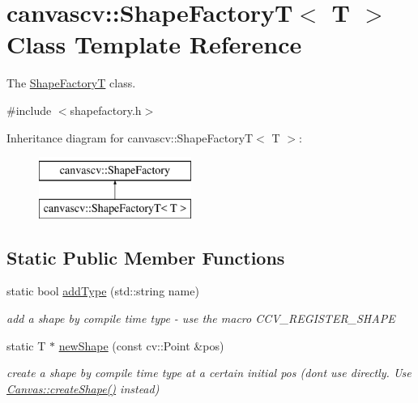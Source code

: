 \hypertarget{classcanvascv_1_1ShapeFactoryT}{}\section{canvascv\+:\+:Shape\+FactoryT$<$ T $>$ Class Template Reference}
\label{classcanvascv_1_1ShapeFactoryT}


The \hyperlink{classcanvascv_1_1ShapeFactoryT}{Shape\+FactoryT} class.  




{\ttfamily \#include $<$shapefactory.\+h$>$}

Inheritance diagram for canvascv\+:\+:Shape\+FactoryT$<$ T $>$\+:\begin{figure}[H]
\begin{center}
\leavevmode
\includegraphics[height=2.000000cm]{classcanvascv_1_1ShapeFactoryT}
\end{center}
\end{figure}
\subsection*{Static Public Member Functions}
\begin{DoxyCompactItemize}
\item 
static bool \hyperlink{classcanvascv_1_1ShapeFactoryT_a7d2e3d1e856ba83cb107439ceee53229}{add\+Type} (std\+::string name)\hypertarget{classcanvascv_1_1ShapeFactoryT_a7d2e3d1e856ba83cb107439ceee53229}{}\label{classcanvascv_1_1ShapeFactoryT_a7d2e3d1e856ba83cb107439ceee53229}

\begin{DoxyCompactList}\small\item\em add a shape by compile time type -\/ use the macro C\+C\+V\+\_\+\+R\+E\+G\+I\+S\+T\+E\+R\+\_\+\+S\+H\+A\+PE \end{DoxyCompactList}\item 
static T $\ast$ \hyperlink{classcanvascv_1_1ShapeFactoryT_a0a0a0d4bae966b362ca68485d34fe1ae}{new\+Shape} (const cv\+::\+Point \&pos)\hypertarget{classcanvascv_1_1ShapeFactoryT_a0a0a0d4bae966b362ca68485d34fe1ae}{}\label{classcanvascv_1_1ShapeFactoryT_a0a0a0d4bae966b362ca68485d34fe1ae}

\begin{DoxyCompactList}\small\item\em create a shape by compile time type at a certain initial pos (don\textquotesingle{}t use directly. Use \hyperlink{classcanvascv_1_1Canvas_a630ac92458f1718d0c597e96dd5a4aef}{Canvas\+::create\+Shape()} instead) \end{DoxyCompactList}\end{DoxyCompactItemize}


